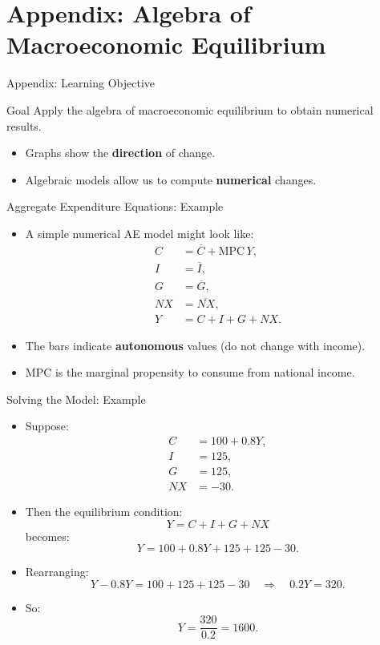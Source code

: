 \documentclass[aspectratio=169]{beamer}
\begin{document}
\section*{Appendix: Algebra of Macroeconomic Equilibrium}

\begin{frame}{Appendix: Learning Objective}
\transfade
\begin{block}{Goal}
Apply the algebra of macroeconomic equilibrium to obtain numerical results.
\end{block}
\begin{itemize}
  \item Graphs show the \textbf{direction} of change.
  \item Algebraic models allow us to compute \textbf{numerical} changes.
\end{itemize}
\end{frame}

\begin{frame}{Aggregate Expenditure Equations: Example}
\transfade
\begin{itemize}
  \item A simple numerical AE model might look like:
  \begin{align*}
    C &= \overline{C} + \text{MPC}\,Y,\\
    I &= \overline{I},\\
    G &= \overline{G},\\
    NX &= \overline{NX},\\
    Y &= C + I + G + NX.
  \end{align*}
  \item The bars indicate \textbf{autonomous} values (do not change with income).
  \item \(\text{MPC}\) is the marginal propensity to consume from national income.
\end{itemize}
\end{frame}

\begin{frame}{Solving the Model: Example}
\transfade
\begin{itemize}
  \item Suppose:
  \begin{align*}
    C &= 100 + 0.8Y,\\
    I &= 125,\\
    G &= 125,\\
    NX &= -30.
  \end{align*}
  \item Then the equilibrium condition:
  \[
    Y = C + I + G + NX
  \]
  becomes:
  \[
    Y = 100 + 0.8Y + 125 + 125 - 30.
  \]
  \item Rearranging:
  \[
    Y - 0.8Y = 100 + 125 + 125 - 30
    \quad \Rightarrow \quad
    0.2Y = 320.
  \]
  \item So:
  \[
    Y = \frac{320}{0.2} = 1600.
  \]
\end{itemize}
\end{frame}
\end{document}
